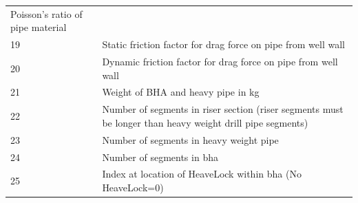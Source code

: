 \begin{longtable}[]{@{}ll@{}}
\begin{minipage}[t]{0.89\columnwidth}
Poisson's ratio of pipe material\strut
\end{minipage}\tabularnewline
\begin{minipage}[t]{0.06\columnwidth}\raggedright
19\strut
\end{minipage} & \begin{minipage}[t]{0.89\columnwidth}\raggedright
Static friction factor for drag force on pipe from well wall\strut
\end{minipage}\tabularnewline
\begin{minipage}[t]{0.06\columnwidth}\raggedright
20\strut
\end{minipage} & \begin{minipage}[t]{0.89\columnwidth}\raggedright
Dynamic friction factor for drag force on pipe from well wall\strut
\end{minipage}\tabularnewline
\begin{minipage}[t]{0.06\columnwidth}\raggedright
21\strut
\end{minipage} & \begin{minipage}[t]{0.89\columnwidth}\raggedright
Weight of BHA and heavy pipe in kg\strut
\end{minipage}\tabularnewline
\begin{minipage}[t]{0.06\columnwidth}\raggedright
22\strut
\end{minipage} & \begin{minipage}[t]{0.89\columnwidth}\raggedright
Number of segments in riser section (riser segments must be longer than
heavy weight drill pipe segments)\strut
\end{minipage}\tabularnewline
\begin{minipage}[t]{0.06\columnwidth}\raggedright
23\strut
\end{minipage} & \begin{minipage}[t]{0.89\columnwidth}\raggedright
Number of segments in heavy weight pipe\strut
\end{minipage}\tabularnewline
\begin{minipage}[t]{0.06\columnwidth}\raggedright
24\strut
\end{minipage} & \begin{minipage}[t]{0.89\columnwidth}\raggedright
Number of segments in bha\strut
\end{minipage}\tabularnewline
\begin{minipage}[t]{0.06\columnwidth}\raggedright
25\strut
\end{minipage} & \begin{minipage}[t]{0.89\columnwidth}\raggedright
Index at location of HeaveLock within bha (No HeaveLock=0)\strut
\end{minipage}\tabularnewline
\bottomrule
\end{longtable}

